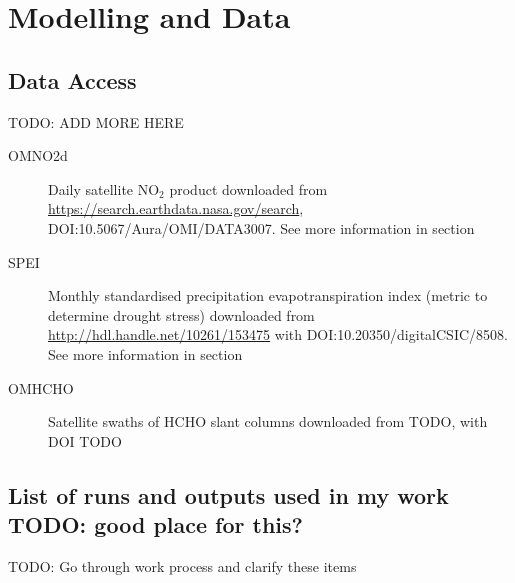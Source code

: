 
\chapter{Modelling and Data} %
\label{Model} %

\section{Data Access}
TODO: ADD MORE HERE
\label{Model:DataAccess}
\begin{description}
  \item[OMNO2d] Daily satellite NO$_2$ product downloaded from \url{https://search.earthdata.nasa.gov/search}, DOI:10.5067/Aura/OMI/DATA3007. 
  See more information in section %
  
  \item[SPEI] Monthly standardised precipitation evapotranspiration index (metric to determine drought stress) downloaded from \url{http://hdl.handle.net/10261/153475} with DOI:10.20350/digitalCSIC/8508.
  See more information in section %
  
  \item[OMHCHO] Satellite swaths of HCHO slant columns downloaded from TODO, with DOI TODO
  
\end{description}



\section{List of runs and outputs used in my work TODO: good place for this?}
  TODO: Go through work process and clarify these items
